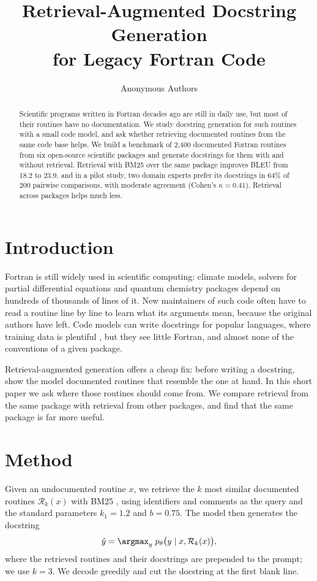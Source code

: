 \documentclass{article}
\title{Retrieval-Augmented Docstring Generation \\ for Legacy Fortran Code}
\author{Anonymous Authors}
\begin{document}
\maketitle

\begin{abstract}
Scientific programs written in Fortran decades ago are still in daily use, but most of their routines have no documentation.
We study docstring generation for such routines with a small code model, and ask whether retrieving documented routines from the same code base helps.
We build a benchmark of 2,400 documented Fortran routines from six open-source scientific packages and generate docstrings for them with and without retrieval.
Retrieval with BM25 over the same package improves BLEU from 18.2 to 23.9, and in a pilot study, two domain experts prefer its docstrings in 64\% of 200 pairwise comparisons, with moderate agreement (Cohen's $\kappa = 0.41$).
Retrieval across packages helps much less.
\end{abstract}

\section{Introduction}
\label{sec:intro}

Fortran is still widely used in scientific computing: climate models, solvers for partial differential equations and quantum chemistry packages depend on hundreds of thousands of lines of it.
New maintainers of such code often have to read a routine line by line to learn what its arguments mean, because the original authors have left.
Code models can write docstrings for popular languages, where training data is plentiful \citep{husain2019codesearchnet}, but they see little Fortran, and almost none of the conventions of a given package.

Retrieval-augmented generation \citep{lewis2020retrieval} offers a cheap fix: before writing a docstring, show the model documented routines that resemble the one at hand.
In this short paper we ask where those routines should come from.
We compare retrieval from the same package with retrieval from other packages, and find that the same package is far more useful.

\section{Method}
\label{sec:method}

Given an undocumented routine $x$, we retrieve the $k$ most similar documented routines $\mathcal{R}_k(x)$ with BM25 \citep{robertson2009probabilistic}, using identifiers and comments as the query and the standard parameters $k_1 = 1.2$ and $b = 0.75$.
The model then generates the docstring
\begin{equation}
\hat{y} = \argmax_{y} \; p_\theta\bigl(y \mid x, \mathcal{R}_k(x)\bigr),
\label{eq:rag}
\end{equation}
where the retrieved routines and their docstrings are prepended to the prompt; we use $k = 3$. %
We decode greedily and cut the docstring at the first blank line.
\end{document}

